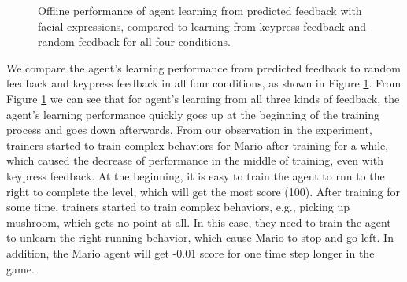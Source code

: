 \begin{figure}[htb]
\begin{tabular}{c c}
\end{tabular}
\caption{Offline performance of agent learning from predicted feedback with facial expressions, compared to learning from keypress feedback and random feedback for all four conditions. }%
\label{learning_from_predicted}
\end{figure}


We compare the agent's learning performance from predicted feedback to random feedback and keypress feedback in all four conditions, as shown in Figure \ref{learning_from_predicted}. From Figure \ref{learning_from_predicted} we can see that for agent's learning from all three kinds of feedback, the agent's learning performance quickly goes up at the beginning of the training process and goes down afterwards. From our observation in the experiment, trainers started to train complex behaviors for Mario after training for a while, which caused the decrease of performance in the middle of training, even with keypress feedback. At the beginning, it is easy to train the agent to run to the right to complete the level, which will get the most score (100). After training for some time, trainers started to train complex behaviors, e.g., picking up mushroom, which gets no point at all. In this case, they need to train the agent to unlearn the right running behavior, which cause Mario to stop and go left. In addition, the Mario agent will get -0.01 score for one time step longer in the game. %


